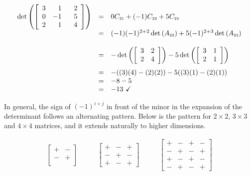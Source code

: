 \[ \begin{array}{rcl} 

\det \left( \left[ \begin{array}{rrr} 3 & 1 & \hphantom{-}2 \\ 0 & -1 & 5 \\ 2 & 1 & 4 \\ \end{array} \right] \right)& = & 0C_{\mbox{\tiny$21$}} + (-1)C_{\mbox{\tiny$22$}}+5C_{\mbox{\tiny$23$}} \\

& = &  (-1) (-1)^{2+2} \det\left(A_{\mbox{\tiny$22$}}\right) + 5 (-1)^{2+3}\det\left(A_{\mbox{\tiny$23$}}\right) \\[13pt]
        
        & = & - \det \left( \left[ \begin{array}{rr} 3 & 2 \\ 2 & 4 \\ \end{array} \right] \right) -5 \det \left( \left[ \begin{array}{rr} 3 & 1 \\ 2 & 1 \\ \end{array} \right] \right) \\[13pt]
        & = & -((3)(4)-(2)(2)) - 5((3)(1)-(2)(1)) \\
        & = & -8-5 \\
        & = & -13 \, \, \checkmark \\ \end{array}  \]

In general, the sign of $(-1)^{i+j}$ in front of the minor in the expansion of the determinant follows an alternating pattern. Below is the pattern for $2 \times 2$, $3 \times 3$ and $4 \times 4$ matrices, and it extends naturally to higher dimensions.  

\[ \begin{array}{ccc}

\left[ \begin{array}{cc} + & - \\ - & + \\ \end{array} \right] 

&
\qquad 

\left[ \begin{array}{ccc} + & - & + \\ - & + & - \\ + & - & +  \end{array} \right] 


&

\qquad

\left[ \begin{array}{cccc} + & - & + & - \\ - & + & - & +\\ + & - & + & - \\ - & + & - & + \end{array} \right] 

\end{array} \]

